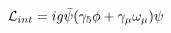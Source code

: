 \begin{equation}
{\cal L}_{int} = i g \bar{\psi} (\gamma_{5} \phi + \gamma_{\mu} \omega_{\mu}) \psi   \label{eq:ab}
\end{equation}

